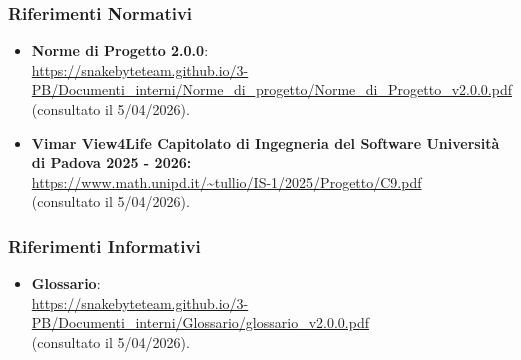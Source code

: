 \subsubsection{Riferimenti Normativi}
\begin{itemize}
    \item \textbf{Norme di Progetto 2.0.0}:
          \\ \url{https://snakebyteteam.github.io/3-PB/Documenti_interni/Norme_di_progetto/Norme_di_Progetto_v2.0.0.pdf}
          \\(consultato il 5/04/2026).

    \item \textbf{Vimar View4Life Capitolato di Ingegneria del Software Università di Padova 2025 - 2026:}
          \\ \url{https://www.math.unipd.it/~tullio/IS-1/2025/Progetto/C9.pdf}
          \\ (consultato il 5/04/2026).
\end{itemize}

\subsubsection{Riferimenti Informativi}
\begin{itemize}
    \item \textbf{Glossario}:
        \\ \url{https://snakebyteteam.github.io/3-PB/Documenti_interni/Glossario/glossario_v2.0.0.pdf} 
        \\ (consultato il 5/04/2026).
\end{itemize}